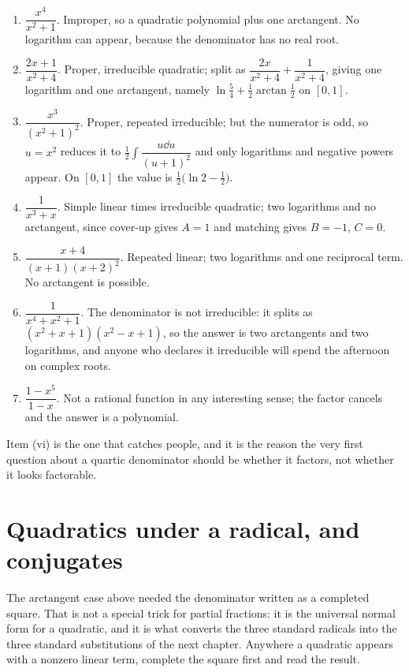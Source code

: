 \begin{enumerate}[label=(\roman*)]
\item $\dfrac{x^4}{x^2+1}$. Improper, so a quadratic polynomial plus one arctangent. No logarithm can appear, because the denominator has no real root.
\item $\dfrac{2x+1}{x^2+4}$. Proper, irreducible quadratic; split as $\dfrac{2x}{x^2+4}+\dfrac{1}{x^2+4}$, giving one logarithm and one arctangent, namely $\ln\tfrac54+\tfrac12\arctan\tfrac12$ on $[0,1]$.
\item $\dfrac{x^3}{(x^2+1)^2}$. Proper, repeated irreducible; but the numerator is odd, so $u=x^2$ reduces it to $\tfrac12\int\dfrac{u\dd u}{(u+1)^2}$ and only logarithms and negative powers appear. On $[0,1]$ the value is $\tfrac12\bigl(\ln2-\tfrac12\bigr)$.
\item $\dfrac{1}{x^3+x}$. Simple linear times irreducible quadratic; two logarithms and no arctangent, since cover-up gives $A=1$ and matching gives $B=-1$, $C=0$.
\item $\dfrac{x+4}{(x+1)(x+2)^2}$. Repeated linear; two logarithms and one reciprocal term. No arctangent is possible.
\item $\dfrac{1}{x^4+x^2+1}$. The denominator is not irreducible: it splits as $(x^2+x+1)(x^2-x+1)$, so the answer is two arctangents and two logarithms, and anyone who declares it irreducible will spend the afternoon on complex roots.
\item $\dfrac{1-x^5}{1-x}$. Not a rational function in any interesting sense; the factor cancels and the answer is a polynomial.
\end{enumerate}

Item (vi) is the one that catches people, and it is the reason the very first question about a quartic denominator should be whether it factors, not whether it looks factorable.

\section{Quadratics under a radical, and conjugates}

The arctangent case above needed the denominator written as a completed square. That is not a special trick for partial fractions: it is the universal normal form for a quadratic, and it is what converts the three standard radicals into the three standard substitutions of the next chapter. Anywhere a quadratic appears with a nonzero linear term, complete the square first and read the result.

